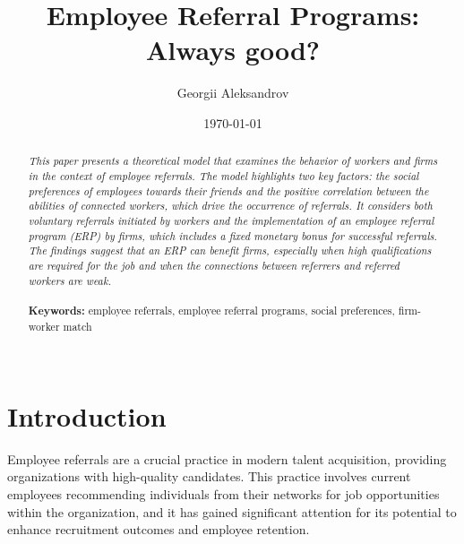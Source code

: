 \documentclass[12pt]{article}
\begin{document}
\begin{titlepage}
\title{Employee Referral Programs: Always good?}%
\author{Georgii Aleksandrov}%
\date{\today}
\maketitle
\begin{abstract}
\noindent \textit{This paper presents a theoretical model that examines the behavior of workers and firms in the context of employee referrals. The model highlights two key factors: the social preferences of employees towards their friends and the positive correlation between the abilities of connected workers, which drive the occurrence of referrals. It considers both voluntary referrals initiated by workers and the implementation of an employee referral program (ERP) by firms, which includes a fixed monetary bonus for successful referrals. The findings suggest that an ERP can benefit firms, especially when high qualifications are required for the job and when the connections between referrers and referred workers are weak.}\\
\vspace{0in}\\
\noindent\textbf{Keywords:} employee referrals, employee referral programs, social preferences, firm-worker match\\
\vspace{0in}\\

\bigskip
\end{abstract}
\setcounter{page}{0}
\thispagestyle{empty}
\end{titlepage}
\pagebreak \newpage




\doublespacing


\section{Introduction} \label{sec:introduction}

Employee referrals are a crucial practice in modern talent acquisition, providing organizations with high-quality candidates. This practice involves current employees recommending individuals from their networks for job opportunities within the organization, and it has gained significant attention for its potential to enhance recruitment outcomes and employee retention.
\end{document}
